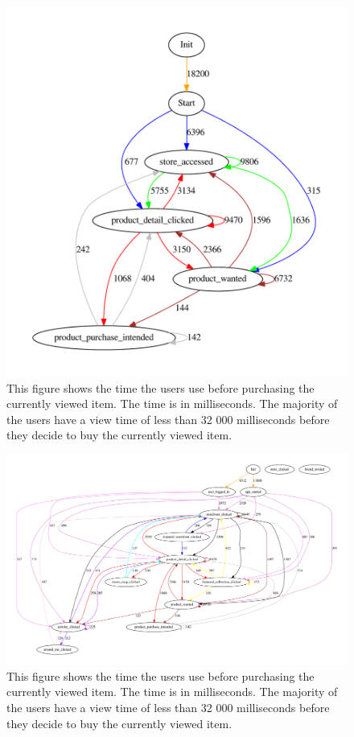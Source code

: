     \begin{figure}[H]
        \includegraphics[width=5in]{image/statesInteractionTrue-gvfile.pdf}
        \centering
        \caption[View time before purchasing an item]{This figure shows the time the users use before purchasing the currently viewed item.
        The time is in milliseconds.
        The majority of the users have a view time of less than 32 000 milliseconds before they decide to buy the currently viewed item.}
        \label{figure:viewBuy}
    \end{figure}

    \begin{figure}[H]
        \includegraphics[width=5in]{image/statesInteractionFalse-gvfile.pdf}
        \centering
        \caption[View time before purchasing an item]{This figure shows the time the users use before purchasing the currently viewed item.
        The time is in milliseconds.
        The majority of the users have a view time of less than 32 000 milliseconds before they decide to buy the currently viewed item.}
        \label{figure:viewBuy}
    \end{figure}

